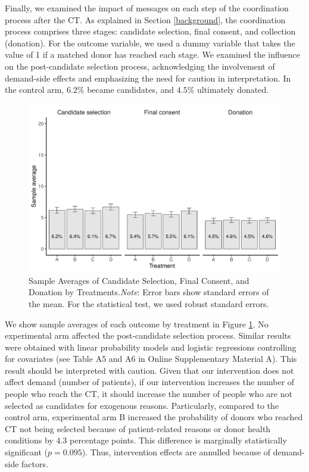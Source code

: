 \documentclass[12pt, a4paper]{article}
\begin{document}
Finally, we examined the impact of messages on each step of the coordination process after the CT. As explained in Section \ref{background}, the coordination process comprises three stages: candidate selection, final consent, and collection (donation). For the outcome variable, we used a dummy variable that takes the value of 1 if a matched donor has reached each stage. We examined the influence on the post-candidate selection process, acknowledging the involvement of demand-side effects and emphasizing the need for caution in interpretation. In the control arm, \(6.2\)\% became candidates, and \(4.5\)\% ultimately donated.

\begin{figure}[t]
\includegraphics{JMDP RCT - Main Document_files/figure-latex/coordinate-diff-mean-1} \caption{Sample Averages of Candidate Selection, Final Consent, and Donation by Treatments.\newline \emph{Note}: Error bars show standard errors of the mean. For the statistical test, we used robust standard errors.}\label{fig:coordinate-diff-mean}
\end{figure}

We show sample averages of each outcome by treatment in Figure \ref{fig:coordinate-diff-mean}. No experimental arm affected the post-candidate selection process. Similar results were obtained with linear probability models and logistic regressions controlling for covariates (see Table A5 and A6 in Online Supplementary Material A). This result should be interpreted with caution. Given that our intervention does not affect demand (number of patients), if our intervention increases the number of people who reach the CT, it should increase the number of people who are not selected as candidates for exogenous reasons. Particularly, compared to the control arm, experimental arm B increased the probability of donors who reached CT not being selected because of patient-related reasons or donor health conditions by \(4.3\) percentage points. This difference is marginally statistically significant (\(p = 0.095\)). Thus, intervention effects are annulled because of demand-side factors.
\end{document}
